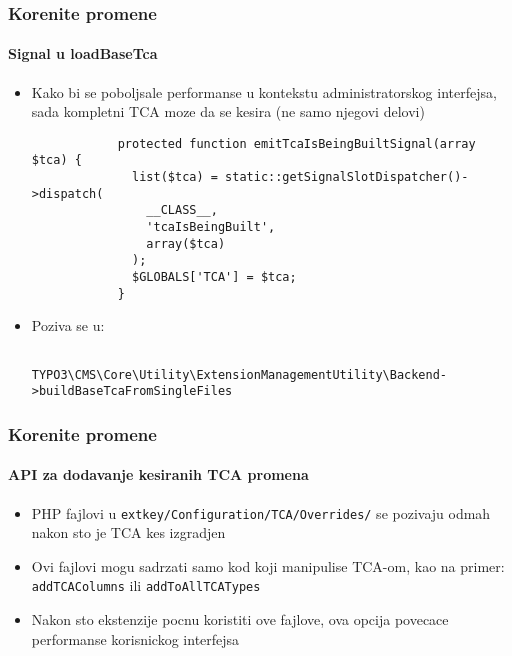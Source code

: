 \begin{frame}[fragile]
	\frametitle{Korenite promene}
	\framesubtitle{Signal u loadBaseTca}

	\lstset{
		basicstyle=\tiny\ttfamily
	}

	\begin{itemize}
		\item Kako bi se poboljsale performanse u kontekstu administratorskog interfejsa,
			sada kompletni TCA moze da se kesira (ne samo njegovi delovi)

		\begin{lstlisting}
			protected function emitTcaIsBeingBuiltSignal(array $tca) {
			  list($tca) = static::getSignalSlotDispatcher()->dispatch(
			    __CLASS__,
			    'tcaIsBeingBuilt',
			    array($tca)
			  );
			  $GLOBALS['TCA'] = $tca;
			}
		\end{lstlisting}

		\item Poziva se u:

			\begin{lstlisting}
				TYPO3\CMS\Core\Utility\ExtensionManagementUtility\Backend->buildBaseTcaFromSingleFiles
			\end{lstlisting}

	\end{itemize}

\end{frame}  


\begin{frame}[fragile]
	\frametitle{Korenite promene}
	\framesubtitle{API za dodavanje kesiranih TCA promena}

	\begin{itemize}
		\item PHP fajlovi u \texttt{extkey/Configuration/TCA/Overrides/}
			se pozivaju odmah nakon sto je TCA kes izgradjen

		\item Ovi fajlovi mogu sadrzati samo kod koji manipulise TCA-om,\newline
			kao na primer: \texttt{addTCAColumns} ili \texttt{addToAllTCATypes}

		\item Nakon sto ekstenzije pocnu koristiti ove fajlove, ova opcija povecace performanse korisnickog interfejsa

	\end{itemize}

\end{frame} 

